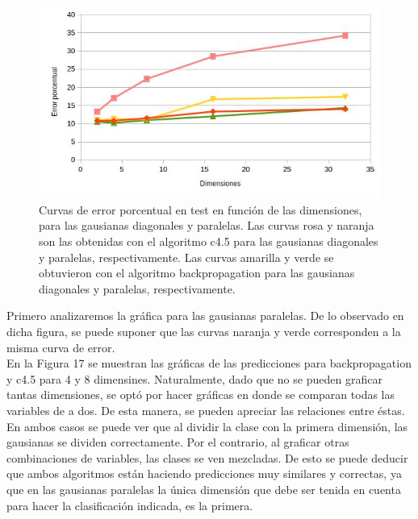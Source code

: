 \documentclass[12pt, a4paper]{article}
\begin{document}
\begin{figure}
    \centering
	\includegraphics[scale=0.7]{ejercicioE}
	\caption{Curvas de error porcentual en test en función de las dimensiones, para las gausianas diagonales y paralelas. Las curvas rosa y naranja son las obtenidas con el algoritmo c4.5 para las gausianas diagonales y paralelas, respectivamente. Las curvas amarilla y verde se obtuvieron con el algoritmo backpropagation para las gausianas diagonales y paralelas, respectivamente. }
\end{figure} 

\bigskip

Primero analizaremos la gráfica para las gausianas paralelas. De lo observado en dicha figura, se puede suponer que las curvas naranja y verde corresponden a la misma curva de error.\\
En la Figura 17 se muestran las gráficas de las predicciones para backpropagation y c4.5 para 4 y 8 dimensines. Naturalmente, dado que no se pueden graficar tantas dimensiones, se optó por hacer gráficas en donde se comparan todas las variables de a dos. De esta manera, se pueden apreciar las relaciones entre éstas. En ambos casos se puede ver que al dividir la clase con la primera dimensión, las gausianas se dividen correctamente. Por el contrario, al graficar otras combinaciones de variables, las clases se ven mezcladas. De esto se puede deducir que ambos algoritmos están haciendo predicciones muy similares y correctas, ya que en las gausianas paralelas la única dimensión que debe ser tenida en cuenta para hacer la clasificación indicada, es la primera.   
\end{document}
